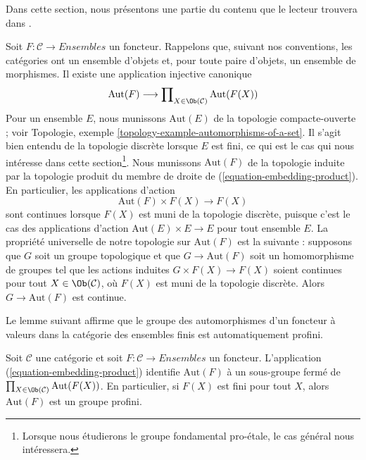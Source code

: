 \noindent
Dans cette section, nous présentons une partie du contenu que le lecteur
trouvera dans \cite[Exposé V, sections 4, 5 et 6]{SGA1}.

\medskip\noindent
Soit $F : \mathcal{C} \to \textit{Ensembles}$ un foncteur.
Rappelons que, suivant nos conventions, les catégories ont un ensemble
d'objets et, pour toute paire d'objets, un ensemble de morphismes. Il existe
une application injective canonique
\begin{equation}
\label{equation-embedding-product}
\text{Aut}(F)
\longrightarrow
\prod\nolimits_{X \in \Ob(\mathcal{C})} \text{Aut}(F(X))
\end{equation}
Pour un ensemble $E$, nous munissons $\text{Aut}(E)$ de la topologie
compacte-ouverte ; voir Topologie, exemple
\ref{topology-example-automorphisms-of-a-set}. Il s'agit bien entendu de la
topologie discrète lorsque $E$ est fini, ce qui est le cas qui nous intéresse
dans cette section\footnote{Lorsque nous étudierons le groupe fondamental
pro-étale, le cas général nous intéressera.}. Nous munissons
$\text{Aut}(F)$ de la topologie induite par la topologie produit du membre de
droite de (\ref{equation-embedding-product}). En particulier, les applications
d'action
$$
\text{Aut}(F) \times F(X) \longrightarrow F(X)
$$
sont continues lorsque $F(X)$ est muni de la topologie discrète, puisque
c'est le cas des applications d'action $\text{Aut}(E) \times E \to E$ pour
tout ensemble $E$. La propriété universelle de notre topologie sur
$\text{Aut}(F)$ est la suivante : supposons que $G$ soit un groupe topologique
et que $G \to \text{Aut}(F)$ soit un homomorphisme de groupes tel que les
actions induites $G \times F(X) \to F(X)$ soient continues pour tout
$X \in \Ob(\mathcal{C})$, où $F(X)$ est muni de la topologie discrète.
Alors $G \to \text{Aut}(F)$ est continue.

\medskip\noindent
Le lemme suivant affirme que le groupe des automorphismes d'un foncteur à
valeurs dans la catégorie des ensembles finis est automatiquement profini.

\begin{lemma}
\label{lemma-aut-inverse-limit}
Soit $\mathcal{C}$ une catégorie et soit
$F : \mathcal{C} \to \textit{Ensembles}$ un foncteur. L'application
(\ref{equation-embedding-product}) identifie $\text{Aut}(F)$ à un sous-groupe
fermé de
$\prod_{X \in \Ob(\mathcal{C})} \text{Aut}(F(X))$.
En particulier, si $F(X)$ est fini pour tout $X$, alors
$\text{Aut}(F)$ est un groupe profini.
\end{lemma}

